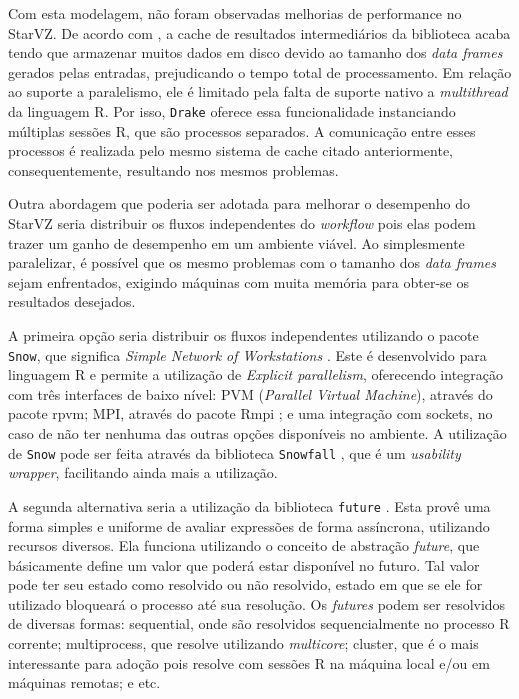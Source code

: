 Com esta modelagem, não foram observadas melhorias de performance no StarVZ. De acordo com \citet{ref:drakestarvz},
a cache de resultados intermediários da biblioteca acaba tendo que armazenar muitos dados em disco devido
ao tamanho dos \emph{data frames} gerados pelas entradas, prejudicando o tempo total de processamento.
Em relação ao suporte a paralelismo, ele é limitado pela falta de suporte nativo a \emph{multithread} da linguagem R.
Por isso, \texttt{Drake} oferece essa funcionalidade instanciando múltiplas sessões R, que são processos separados. A comunicação
entre esses processos é realizada pelo mesmo sistema de cache citado anteriormente, consequentemente, resultando nos mesmos
problemas.

Outra abordagem que poderia ser adotada para melhorar o desempenho do StarVZ seria distribuir os fluxos independentes
do \emph{workflow} pois elas podem trazer um ganho de desempenho em um ambiente viável.
Ao simplesmente paralelizar, é possível que os mesmo problemas com o tamanho dos \emph{data frames} sejam enfrentados, exigindo
máquinas com muita memória para obter-se os resultados desejados. 

A primeira opção seria distribuir os fluxos independentes utilizando o pacote \texttt{Snow}, que significa 
\emph{Simple Network of Workstations} \cite{ref:snow}. Este é desenvolvido para linguagem R e permite a utilização
de \emph{Explicit parallelism}, oferecendo integração com três interfaces de baixo nível: PVM (\emph{Parallel Virtual Machine}), através do pacote rpvm; MPI, através do pacote Rmpi \cite{ref:rmpi}; e uma integração com sockets, no caso de não ter nenhuma das outras 
opções disponíveis no ambiente. A utilização de \texttt{Snow} pode ser feita através da biblioteca \texttt{Snowfall} \cite{ref:snowfall},
que é um \emph{usability wrapper}, facilitando ainda mais a utilização.

A segunda alternativa seria a utilização da biblioteca \texttt{future} \cite{ref:future}. Esta provê uma forma simples e uniforme 
de avaliar expressões de forma assíncrona, utilizando recursos diversos. Ela funciona utilizando o conceito de abstração 
\emph{future}, que básicamente define um valor que poderá estar disponível no futuro. Tal valor pode ter seu estado como 
resolvido ou não resolvido, estado em que se ele for utilizado bloqueará o processo até sua resolução. Os \emph{futures} 
podem ser resolvidos de diversas formas: sequential, onde são resolvidos sequencialmente no processo R corrente; multiprocess,
que resolve utilizando \emph{multicore}; cluster, que é o mais interessante para adoção pois resolve com sessões R na máquina 
local e/ou em máquinas remotas; e etc.